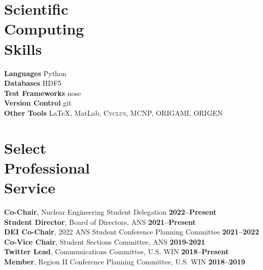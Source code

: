 \documentclass[margin,line]{resume}
\newcommand{\Cyclus}{\textsc{Cyclus}\xspace}%
\begin{document}
\begin{resume}
    \section{\mysidestyle Scientific\\Computing\\Skills}
                \textbf{Languages} \hfill Python\vspace{.5mm}\\%
                \textbf{Databases} \hfill HDF5\vspace{.5mm}\\%
                \textbf{Test Frameworks} \hfill nose\vspace{.5mm}\\%
                \textbf{Version Control} \hfill git\vspace{.5mm}\\%
                \textbf{Other Tools} \hfill \LaTeX, MatLab, \Cyclus, MCNP, ORIGAMI, ORIGEN\vspace{.5mm}%
        \vspace{-3mm}

    \section{\mysidestyle Select\\Professional\\Service}
                \textbf{Co-Chair}, Nuclear Engineering Student Delegation \hfill\textbf{2022--Present}\\
                \textbf{Student Director}, Board of Directors, ANS \hfill \textbf{2021--Present}\vspace{.5mm}\\%
                \textbf{DEI Co-Chair}, 2022 ANS Student Conference Planning Committee \hfill \textbf{2021--2022}\vspace{.5mm}\\%
                \textbf{Co-Vice Chair}, Student Sections Committee, ANS \hfill \textbf{2019-2021}\\
                \textbf{Twitter Lead}, Communications Committee, U.S. WIN  \hfill \textbf{2018--Present}\vspace{.5mm}\\%
                \textbf{Member}, Region II Conference Planning Committee, U.S. WIN  \hfill \textbf{2018--2019}\vspace{.5mm}\\%



\end{resume}
\end{document}
